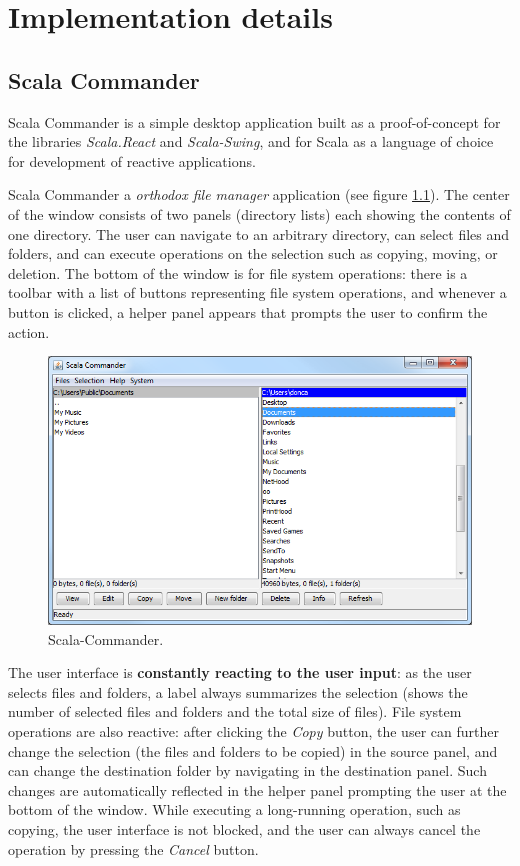 
\chapter{Implementation details}\label{chap:implementation-details}

\section{Scala Commander}

Scala Commander is a simple desktop application built as a proof-of-concept for the libraries \emph{Scala.React} and \emph{Scala-Swing}, and for Scala as a language of choice for development of reactive applications.

Scala Commander a \emph{orthodox file manager} application (see figure \ref{fig:scomm_main}). The center of the window consists of two panels (directory lists) each showing the contents of one directory. The user can navigate to an arbitrary directory, can select files and folders, and can execute operations on the selection such as copying, moving, or deletion. The bottom of the window is for file system operations: there is a toolbar with a list of buttons representing file system operations, and whenever a button is clicked, a helper panel appears that prompts the user to confirm the action.

\begin{figure}[h!] 
  \centering
    \includegraphics[width=1\textwidth]{images/scala-commander-main.png}
  \caption{Scala-Commander.}
  \label{fig:scomm_main}  
\end{figure}

The user interface is \textbf{constantly reacting to the user input}: as the user selects files and folders, a label always summarizes the selection (shows the number of selected files and folders and the total size of files). File system operations are also reactive: after clicking the \emph{Copy} button, the user can further change the selection (the files and folders to be copied) in the source panel, and can change the destination folder by navigating in the destination panel. Such changes are automatically reflected in the helper panel prompting the user at the bottom of the window. While executing a long-running operation, such as copying, the user interface is not blocked, and the user can always cancel the operation by pressing the \emph{Cancel} button.

